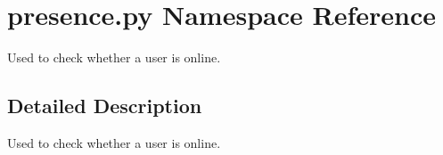 \hypertarget{namespacepresence_1_1py}{}\section{presence.\+py Namespace Reference}
\label{namespacepresence_1_1py}


Used to check whether a user is online.  




\subsection{Detailed Description}
Used to check whether a user is online. 